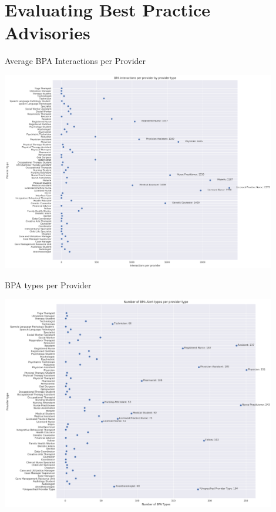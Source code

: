 \documentclass[10pt]{beamer}
\begin{document}
\section{Evaluating Best Practice Advisories}

\begin{frame}{Average BPA Interactions per Provider}
	\begin{center}
		\includegraphics[width=0.9\textwidth, center, trim=0cm 0cm 0cm 0cm]{images/avg_int_per_provider.png}
	\end{center}
\end{frame}

\begin{frame}{BPA types per Provider}
	\begin{center}
		\includegraphics[width=0.9\textwidth, center, trim=0cm 0cm 0cm 0cm]{images/type_per_provider.png}
	\end{center}
\end{frame}
\end{document}
